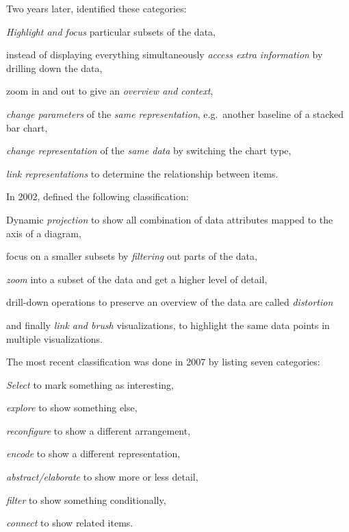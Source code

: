 Two years later, \textcite{Dix1998} identified these categories:
\begin{enumerate*}[label=(\arabic*)]
  \item
    \emph{Highlight and focus} particular subsets of the data,
  \item
    instead of displaying everything simultaneously \emph{access extra information} by drilling down the data,
  \item
    zoom in and out to give an \emph{overview and context},
  \item
    \emph{change parameters} of the \emph{same representation}, e.g.\ another baseline of a stacked bar chart,
  \item
    \emph{change representation} of the \emph{same data} by switching the chart type,
  \item
    \emph{link representations} to determine the relationship between items.
\end{enumerate*}

In 2002, \textcite{Keim2002} defined the following classification:
\begin{enumerate*}[label=(\arabic*)]
  \item
    Dynamic \emph{projection} to show all combination of data attributes mapped to the axis of a diagram,
  \item
    focus on a smaller subsets by \emph{filtering} out parts of the data,
  \item
    \emph{zoom} into a subset of the data and get a higher level of detail,
  \item
     drill-down operations to preserve an overview of the data are called \emph{distortion}
  \item
    and finally \emph{link and brush} visualizations, to highlight the same data points in multiple visualizations.
\end{enumerate*}

The most recent classification was done in 2007 by \textcite{Yi2007} listing seven categories:
\begin{enumerate*}[label=(\arabic*)]
  \item
    \emph{Select} to mark something as interesting,
  \item
    \emph{explore} to show something else,
  \item
    \emph{reconfigure} to show a different arrangement,
  \item
    \emph{encode} to show a different representation,
  \item
    \emph{abstract/elaborate} to show more or less detail,
  \item
    \emph{filter} to show something conditionally,
  \item
    \emph{connect} to show related items.
\end{enumerate*}

